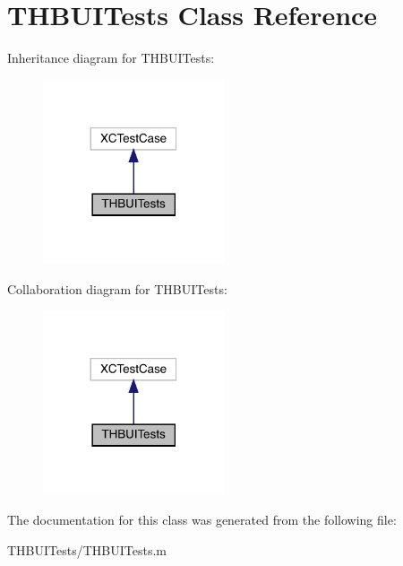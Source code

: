 \hypertarget{interface_t_h_b_u_i_tests}{}\section{T\+H\+B\+U\+I\+Tests Class Reference}
\label{interface_t_h_b_u_i_tests}


Inheritance diagram for T\+H\+B\+U\+I\+Tests\+:\nopagebreak
\begin{figure}[H]
\begin{center}
\leavevmode
\includegraphics[width=152pt]{interface_t_h_b_u_i_tests__inherit__graph}
\end{center}
\end{figure}


Collaboration diagram for T\+H\+B\+U\+I\+Tests\+:\nopagebreak
\begin{figure}[H]
\begin{center}
\leavevmode
\includegraphics[width=152pt]{interface_t_h_b_u_i_tests__coll__graph}
\end{center}
\end{figure}


The documentation for this class was generated from the following file\+:\begin{DoxyCompactItemize}
\item 
T\+H\+B\+U\+I\+Tests/T\+H\+B\+U\+I\+Tests.\+m\end{DoxyCompactItemize}
